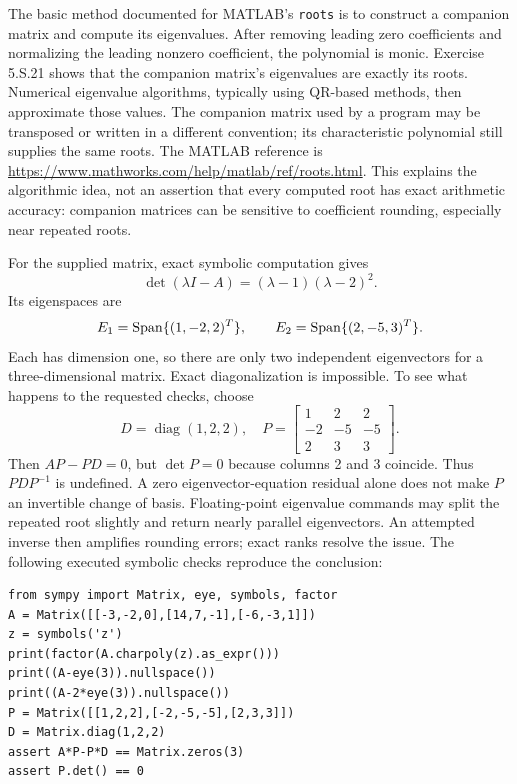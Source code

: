 The basic method documented for MATLAB's \texttt{roots} is to
construct a companion matrix and compute its eigenvalues. After
removing leading zero coefficients and normalizing the leading
nonzero coefficient, the polynomial is monic. Exercise 5.S.21
shows that the companion matrix's eigenvalues are exactly its roots.
Numerical eigenvalue algorithms, typically using QR-based methods,
then approximate those values. The companion matrix used by a
program may be transposed or written in a different convention;
its characteristic polynomial still supplies the same roots.
The MATLAB reference is
\url{https://www.mathworks.com/help/matlab/ref/roots.html}.
This explains the algorithmic idea, not an assertion that every
computed root has exact arithmetic accuracy: companion matrices can
be sensitive to coefficient rounding, especially near repeated roots.

For the supplied matrix, exact symbolic computation gives
\[\det(\lambda I-A)=(\lambda-1)(\lambda-2)^2.\]
Its eigenspaces are
\[E_1=\operatorname{Span}\{(1,-2,2)^T\},\qquad
E_2=\operatorname{Span}\{(2,-5,3)^T\}.\]
Each has dimension one, so there are only two independent eigenvectors
for a three-dimensional matrix. Exact diagonalization is impossible.
To see what happens to the requested checks, choose
\[D=\operatorname{diag}(1,2,2),\quad
P=\begin{bmatrix}1&2&2\\-2&-5&-5\\2&3&3\end{bmatrix}.\]
Then $AP-PD=0$, but $\det P=0$ because columns 2 and 3 coincide.
Thus $PDP^{-1}$ is undefined. A zero eigenvector-equation residual
alone does not make $P$ an invertible change of basis.
Floating-point eigenvalue commands may split the repeated root
slightly and return nearly parallel eigenvectors. An attempted inverse
then amplifies rounding errors; exact ranks resolve the issue.
The following executed symbolic checks reproduce the conclusion:
\begin{verbatim}
from sympy import Matrix, eye, symbols, factor
A = Matrix([[-3,-2,0],[14,7,-1],[-6,-3,1]])
z = symbols('z')
print(factor(A.charpoly(z).as_expr()))
print((A-eye(3)).nullspace())
print((A-2*eye(3)).nullspace())
P = Matrix([[1,2,2],[-2,-5,-5],[2,3,3]])
D = Matrix.diag(1,2,2)
assert A*P-P*D == Matrix.zeros(3)
assert P.det() == 0
\end{verbatim}

